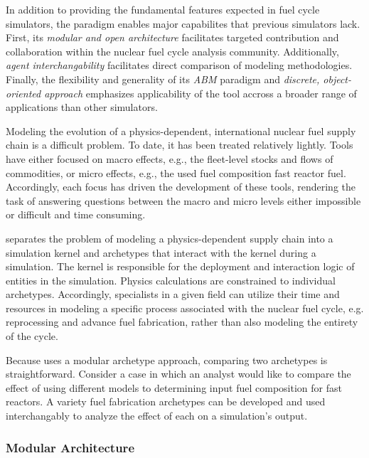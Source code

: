 In addition to providing the fundamental features expected in fuel cycle 
simulators, the \Cyclus paradigm enables major capabilites that previous 
simulators lack. First, its \emph{modular and open architecture}  facilitates 
targeted contribution and collaboration within the nuclear fuel cycle analysis 
community.  Additionally, \emph{agent interchangability} facilitates direct 
comparison of modeling methodologies. Finally, the flexibility and generality 
of its \emph{\gls{ABM}} paradigm and \emph{discrete, object-oriented approach} 
emphasizes applicability of the \Cyclus tool accross a broader range of 
applications than other simulators. 

Modeling the evolution of a physics-dependent, international nuclear fuel supply
chain is a difficult problem. To date, it has been treated relatively
lightly. Tools have either focused on macro effects, e.g., the fleet-level
stocks and flows of commodities, or micro effects, e.g., the used fuel
composition fast reactor fuel. Accordingly, each focus has driven the
development of these tools, rendering the task of answering questions between
the macro and micro levels either impossible or difficult and time consuming. 

\Cyclus separates the problem of modeling a
physics-dependent supply chain into a simulation kernel and archetypes that
interact with the kernel during a simulation. The kernel is responsible for the
deployment and interaction logic of entities in the simulation. Physics
calculations are constrained to individual archetypes. Accordingly, specialists
in a given field can utilize their time and resources in modeling a specific
process associated with the nuclear fuel cycle, e.g. reprocessing and advance
fuel fabrication, rather than also modeling the entirety of the cycle.

Because \Cyclus uses a modular archetype approach, comparing two archetypes is
straightforward. Consider a case in which an analyst would like to compare the
effect of using different models to determining input fuel composition for fast
reactors. A variety fuel fabrication archetypes can be developed and used
interchangably to analyze the effect of each on a simulation's output.

\subsubsection{Modular Architecture}

